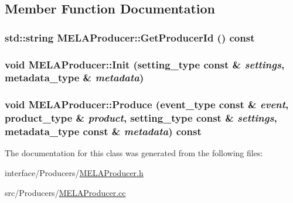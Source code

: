 \subsection{Member Function Documentation}
\hypertarget{classMELAProducer_a7c01509443cf2a8b3c64347153c00abd}{
\subsubsection[{GetProducerId}]{\setlength{\rightskip}{0pt plus 5cm}std::string MELAProducer::GetProducerId () const}}
\label{classMELAProducer_a7c01509443cf2a8b3c64347153c00abd}
\hypertarget{classMELAProducer_abbf59864ab6d88fed3ae26fc01301f7f}{
\subsubsection[{Init}]{\setlength{\rightskip}{0pt plus 5cm}void MELAProducer::Init (setting\_\-type const \& {\em settings}, \/  metadata\_\-type \& {\em metadata})}}
\label{classMELAProducer_abbf59864ab6d88fed3ae26fc01301f7f}
\hypertarget{classMELAProducer_aa44138887fbffc7532695727226d068b}{
\subsubsection[{Produce}]{\setlength{\rightskip}{0pt plus 5cm}void MELAProducer::Produce (event\_\-type const \& {\em event}, \/  product\_\-type \& {\em product}, \/  setting\_\-type const \& {\em settings}, \/  metadata\_\-type const \& {\em metadata}) const}}
\label{classMELAProducer_aa44138887fbffc7532695727226d068b}


The documentation for this class was generated from the following files:\begin{DoxyCompactItemize}
\item 
interface/Producers/\hyperlink{MELAProducer_8h}{MELAProducer.h}\item 
src/Producers/\hyperlink{MELAProducer_8cc}{MELAProducer.cc}\end{DoxyCompactItemize}
